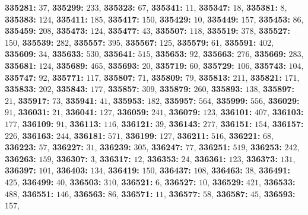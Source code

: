 \textsf{\bfseries 335281:} $37$, \textsf{\bfseries 335299:} $233$, \textsf{\bfseries 335323:} $67$, \textsf{\bfseries 335341:} $11$, \textsf{\bfseries 335347:} $18$, \textsf{\bfseries 335381:} $8$, \textsf{\bfseries 335383:} $124$, \textsf{\bfseries 335411:} $185$, \textsf{\bfseries 335417:} $150$, \textsf{\bfseries 335429:} $10$, \textsf{\bfseries 335449:} $157$, \textsf{\bfseries 335453:} $86$, \textsf{\bfseries 335459:} $208$, \textsf{\bfseries 335473:} $124$, \textsf{\bfseries 335477:} $43$, \textsf{\bfseries 335507:} $118$, \textsf{\bfseries 335519:} $378$, \textsf{\bfseries 335527:} $150$, \textsf{\bfseries 335539:} $282$, \textsf{\bfseries 335557:} $395$, \textsf{\bfseries 335567:} $125$, \textsf{\bfseries 335579:} $61$, \textsf{\bfseries 335591:} $402$, \textsf{\bfseries 335609:} $34$, \textsf{\bfseries 335633:} $530$, \textsf{\bfseries 335641:} $515$, \textsf{\bfseries 335653:} $92$, \textsf{\bfseries 335663:} $276$, \textsf{\bfseries 335669:} $283$, \textsf{\bfseries 335681:} $124$, \textsf{\bfseries 335689:} $465$, \textsf{\bfseries 335693:} $20$, \textsf{\bfseries 335719:} $60$, \textsf{\bfseries 335729:} $106$, \textsf{\bfseries 335743:} $104$, \textsf{\bfseries 335747:} $92$, \textsf{\bfseries 335771:} $117$, \textsf{\bfseries 335807:} $71$, \textsf{\bfseries 335809:} $79$, \textsf{\bfseries 335813:} $211$, \textsf{\bfseries 335821:} $171$, \textsf{\bfseries 335833:} $202$, \textsf{\bfseries 335843:} $177$, \textsf{\bfseries 335857:} $309$, \textsf{\bfseries 335879:} $260$, \textsf{\bfseries 335893:} $138$, \textsf{\bfseries 335897:} $21$, \textsf{\bfseries 335917:} $73$, \textsf{\bfseries 335941:} $41$, \textsf{\bfseries 335953:} $182$, \textsf{\bfseries 335957:} $564$, \textsf{\bfseries 335999:} $556$, \textsf{\bfseries 336029:} $91$, \textsf{\bfseries 336031:} $21$, \textsf{\bfseries 336041:} $127$, \textsf{\bfseries 336059:} $241$, \textsf{\bfseries 336079:} $123$, \textsf{\bfseries 336101:} $407$, \textsf{\bfseries 336103:} $177$, \textsf{\bfseries 336109:} $91$, \textsf{\bfseries 336113:} $116$, \textsf{\bfseries 336121:} $39$, \textsf{\bfseries 336143:} $277$, \textsf{\bfseries 336151:} $154$, \textsf{\bfseries 336157:} $226$, \textsf{\bfseries 336163:} $244$, \textsf{\bfseries 336181:} $571$, \textsf{\bfseries 336199:} $127$, \textsf{\bfseries 336211:} $516$, \textsf{\bfseries 336221:} $68$, \textsf{\bfseries 336223:} $57$, \textsf{\bfseries 336227:} $31$, \textsf{\bfseries 336239:} $305$, \textsf{\bfseries 336247:} $77$, \textsf{\bfseries 336251:} $519$, \textsf{\bfseries 336253:} $242$, \textsf{\bfseries 336263:} $159$, \textsf{\bfseries 336307:} $3$, \textsf{\bfseries 336317:} $12$, \textsf{\bfseries 336353:} $24$, \textsf{\bfseries 336361:} $123$, \textsf{\bfseries 336373:} $131$, \textsf{\bfseries 336397:} $101$, \textsf{\bfseries 336403:} $134$, \textsf{\bfseries 336419:} $150$, \textsf{\bfseries 336437:} $108$, \textsf{\bfseries 336463:} $38$, \textsf{\bfseries 336491:} $425$, \textsf{\bfseries 336499:} $40$, \textsf{\bfseries 336503:} $310$, \textsf{\bfseries 336521:} $6$, \textsf{\bfseries 336527:} $10$, \textsf{\bfseries 336529:} $421$, \textsf{\bfseries 336533:} $488$, \textsf{\bfseries 336551:} $146$, \textsf{\bfseries 336563:} $86$, \textsf{\bfseries 336571:} $11$, \textsf{\bfseries 336577:} $58$, \textsf{\bfseries 336587:} $45$, \textsf{\bfseries 336593:} $157$, 
